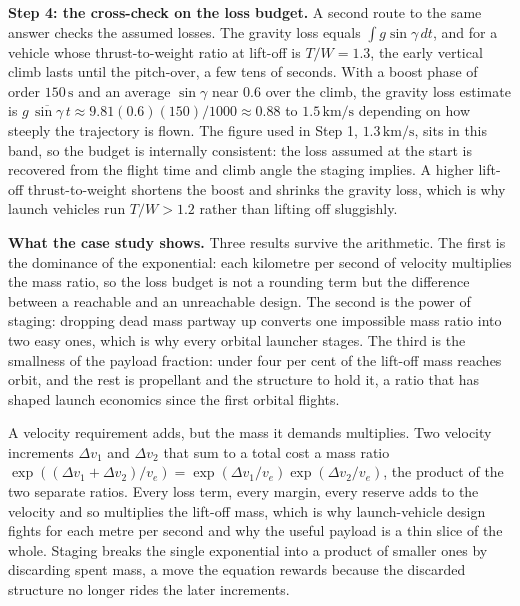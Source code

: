 \textbf{Step 4: the cross-check on the loss budget.} A second route to
the same answer checks the assumed losses. The gravity loss equals
$\int g\sin\gamma\,dt$, and for a vehicle whose thrust-to-weight ratio
at lift-off is $T/W=1.3$, the early vertical climb lasts until the
pitch-over, a few tens of seconds. With a boost phase of order
$150\,\si{\second}$ and an average $\sin\gamma$ near $0.6$ over the
climb, the gravity loss estimate is $g\,\overline{\sin\gamma}\,t\approx
9.81(0.6)(150)/1000\approx 0.88$ to $1.5\,\si{\kilo\meter\per\second}$
depending on how steeply the trajectory is flown. The figure used in
Step 1, $1.3\,\si{\kilo\meter\per\second}$, sits in this band, so the
budget is internally consistent: the loss assumed at the start is
recovered from the flight time and climb angle the staging implies. A
higher lift-off thrust-to-weight shortens the boost and shrinks the
gravity loss, which is why launch vehicles run $T/W>1.2$ rather than
lifting off sluggishly.

\textbf{What the case study shows.} Three results survive the
arithmetic. The first is the dominance of the exponential: each
kilometre per second of velocity multiplies the mass ratio, so the
loss budget is not a rounding term but the difference between a
reachable and an unreachable design. The second is the power of
staging: dropping dead mass partway up converts one impossible mass
ratio into two easy ones, which is why every orbital launcher stages.
The third is the smallness of the payload fraction: under four per cent
of the lift-off mass reaches orbit, and the rest is propellant and the
structure to hold it, a ratio that has shaped launch economics since
the first orbital flights.

\begin{principle}
A velocity requirement adds, but the mass it demands multiplies. Two
velocity increments $\Delta v_{1}$ and $\Delta v_{2}$ that sum to a
total cost a mass ratio $\exp((\Delta v_{1}+\Delta v_{2})/v_{e})=
\exp(\Delta v_{1}/v_{e})\exp(\Delta v_{2}/v_{e})$, the product of the
two separate ratios. Every loss term, every margin, every reserve adds
to the velocity and so multiplies the lift-off mass, which is why
launch-vehicle design fights for each metre per second and why the
useful payload is a thin slice of the whole. Staging breaks the single
exponential into a product of smaller ones by discarding spent mass, a
move the equation rewards because the discarded structure no longer
rides the later increments.
\end{principle}

